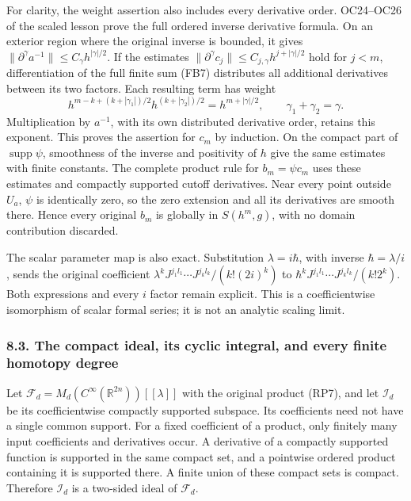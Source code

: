 \documentclass[
  11pt,
]{article}
\begin{document}
For clarity, the weight assertion also includes every derivative order.
OC24--OC26 of the scaled lesson prove the full ordered inverse
derivative formula. On an exterior region where the original inverse is
bounded, it gives
\(\|\partial^\gamma a^{-1}\|\le C_\gamma h^{|\gamma|/2}\). If the
estimates \(\|\partial^\gamma c_j\|\le C_{j,\gamma}h^{j+|\gamma|/2}\)
hold for \(j<m\), differentiation of the full finite sum (FB7)
distributes all additional derivatives between its two factors. Each
resulting term has weight \[
 h^{m-k+(k+|\gamma_1|)/2}
 h^{(k+|\gamma_2|)/2}
 =h^{m+|\gamma|/2},\qquad \gamma_1+\gamma_2=\gamma.
 \tag{FB9}
\] Multiplication by \(a^{-1}\), with its own distributed derivative
order, retains this exponent. This proves the assertion for \(c_m\) by
induction. On the compact part of \(\operatorname{supp}\psi\),
smoothness of the inverse and positivity of \(h\) give the same
estimates with finite constants. The complete product rule for
\(b_m=\psi c_m\) uses these estimates and compactly supported cutoff
derivatives. Near every point outside \(U_a\), \(\psi\) is identically
zero, so the zero extension and all its derivatives are smooth there.
Hence every original \(b_m\) is globally in \(S(h^m,g)\), with no domain
contribution discarded.

The scalar parameter map is also exact. Substitution \(\lambda=i\hbar\),
with inverse \(\hbar=\lambda/i\), sends the original coefficient
\(\lambda^kJ^{j_1l_1}\cdots J^{j_kl_k}/(k!(2i)^k)\) to
\(\hbar^kJ^{j_1l_1}\cdots J^{j_kl_k}/(k!2^k)\). Both expressions and
every \(i\) factor remain explicit. This is a coefficientwise
isomorphism of scalar formal series; it is not an analytic scaling
limit.

\subsubsection{8.3. The compact ideal, its cyclic integral, and every
finite homotopy
degree}\label{the-compact-ideal-its-cyclic-integral-and-every-finite-homotopy-degree}

Let \(\mathcal F_d=M_d(C^\infty(\mathbb R^{2n}))[[\lambda]]\) with the
original product (RP7), and let \(\mathcal I_d\) be its coefficientwise
compactly supported subspace. Its coefficients need not have a single
common support. For a fixed coefficient of a product, only finitely many
input coefficients and derivatives occur. A derivative of a compactly
supported function is supported in the same compact set, and a pointwise
ordered product containing it is supported there. A finite union of
these compact sets is compact. Therefore \(\mathcal I_d\) is a two-sided
ideal of \(\mathcal F_d\).
\end{document}
